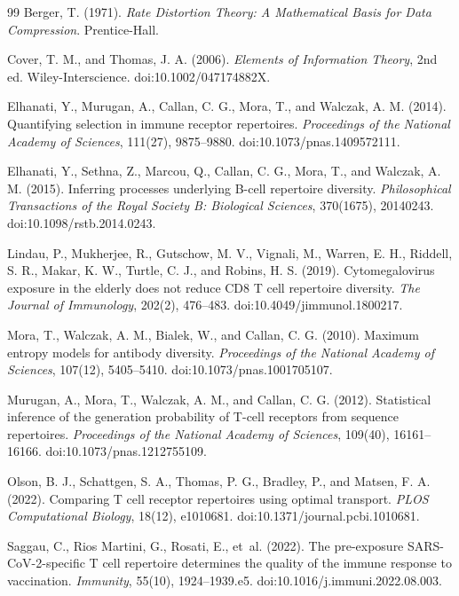 \documentclass[11pt]{article}
\begin{document}
\begin{thebibliography}{99}
Berger, T. (1971). \emph{Rate Distortion Theory: A Mathematical Basis for Data Compression}. Prentice-Hall.

Cover, T. M., and Thomas, J. A. (2006). \emph{Elements of Information Theory}, 2nd ed. Wiley-Interscience. doi:10.1002/047174882X.

Elhanati, Y., Murugan, A., Callan, C. G., Mora, T., and Walczak, A. M. (2014). Quantifying selection in immune receptor repertoires. \emph{Proceedings of the National Academy of Sciences}, 111(27), 9875--9880. doi:10.1073/pnas.1409572111.

Elhanati, Y., Sethna, Z., Marcou, Q., Callan, C. G., Mora, T., and Walczak, A. M. (2015). Inferring processes underlying B-cell repertoire diversity. \emph{Philosophical Transactions of the Royal Society B: Biological Sciences}, 370(1675), 20140243. doi:10.1098/rstb.2014.0243.

Lindau, P., Mukherjee, R., Gutschow, M. V., Vignali, M., Warren, E. H., Riddell, S. R., Makar, K. W., Turtle, C. J., and Robins, H. S. (2019). Cytomegalovirus exposure in the elderly does not reduce CD8 T cell repertoire diversity. \emph{The Journal of Immunology}, 202(2), 476--483. doi:10.4049/jimmunol.1800217.

Mora, T., Walczak, A. M., Bialek, W., and Callan, C. G. (2010). Maximum entropy models for antibody diversity. \emph{Proceedings of the National Academy of Sciences}, 107(12), 5405--5410. doi:10.1073/pnas.1001705107.

Murugan, A., Mora, T., Walczak, A. M., and Callan, C. G. (2012). Statistical inference of the generation probability of T-cell receptors from sequence repertoires. \emph{Proceedings of the National Academy of Sciences}, 109(40), 16161--16166. doi:10.1073/pnas.1212755109.

Olson, B. J., Schattgen, S. A., Thomas, P. G., Bradley, P., and Matsen, F. A. (2022). Comparing T cell receptor repertoires using optimal transport. \emph{PLOS Computational Biology}, 18(12), e1010681. doi:10.1371/journal.pcbi.1010681.

Saggau, C., Rios Martini, G., Rosati, E., et~al. (2022). The pre-exposure SARS-CoV-2-specific T cell repertoire determines the quality of the immune response to vaccination. \emph{Immunity}, 55(10), 1924--1939.e5. doi:10.1016/j.immuni.2022.08.003.


\end{thebibliography}
\end{document}
